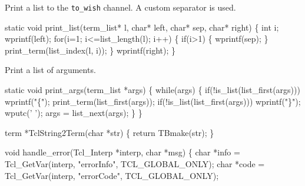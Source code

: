Print a list to the {\tt to\_wish} channel. A custom separator is used.

\nwenddocs{}\endmoddef\let\nwnotused=\nwoutput{}
static void print_list(term_list* l, char* left, char* sep, char* right)
\{
   int i;
   wprintf(left);
   for(i=1; i<=list_length(l); i++) \{
      if(i>1) \{
         wprintf(sep);
      \}
      print_term(list_index(l, i));
   \}
   wprintf(right);
\}
\nwendcode{}\nwdocspar


Print a list of arguments.

\nwenddocs{}\endmoddef\let\nwnotused=\nwoutput{}
static void print_args(term_list *args)
\{
  while(args) \{
    if(!is_list(list_first(args)))
      wprintf("\{");
    print_term(list_first(args));
    if(!is_list(list_first(args)))
      wprintf("\}");
    wputc(' ');
    args = list_next(args);
  \}
\}
\nwendcode{}\nwdocspar




\nwenddocs{}\endmoddef\let\nwnotused=\nwoutput{}

term *TclString2Term(char *str)
\{
  return TBmake(str);
\}

\nwendcode{}\nwdocspar



\nwenddocs{}\endmoddef\let\nwnotused=\nwoutput{}
void handle_error(Tcl_Interp *interp, char *msg)
\{
  char *info = Tcl_GetVar(interp, "errorInfo", TCL_GLOBAL_ONLY);
  char *code = Tcl_GetVar(interp, "errorCode", TCL_GLOBAL_ONLY);

